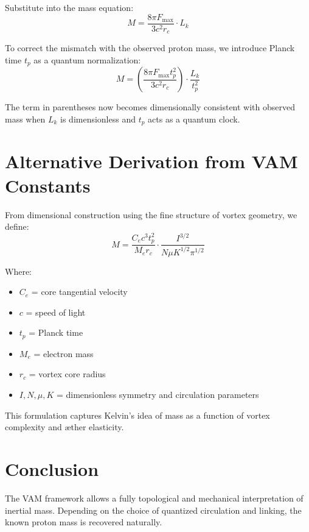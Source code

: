 \documentclass[12pt]{article}
\begin{document}
    Substitute into the mass equation:
    \begin{equation}
        M = \frac{8\pi F_{\max}}{3 c^2 r_c} \cdot L_k
    \end{equation}

    To correct the mismatch with the observed proton mass, we introduce Planck time $t_p$ as a quantum normalization:
    \begin{equation}
        M = \left( \frac{8\pi F_{\max} t_p^2}{3 c^2 r_c} \right) \cdot \frac{L_k}{t_p^2}
    \end{equation}

    The term in parentheses now becomes dimensionally consistent with observed mass when $L_k$ is dimensionless and $t_p$ acts as a quantum clock.

    \section{Alternative Derivation from VAM Constants}
    From dimensional construction using the fine structure of vortex geometry, we define:
    \begin{equation}
        \boxed{
            M = \frac{C_e c^3 t_p^2}{M_e r_c} \cdot \frac{I^{3/2}}{N \mu K^{1/2} \pi^{1/2}}
        }
    \end{equation}

    Where:
    \begin{itemize}
        \item $C_e$ = core tangential velocity
        \item $c$ = speed of light
        \item $t_p$ = Planck time
        \item $M_e$ = electron mass
        \item $r_c$ = vortex core radius
        \item $I, N, \mu, K$ = dimensionless symmetry and circulation parameters
    \end{itemize}

    This formulation captures Kelvin's idea of mass as a function of vortex complexity and æther elasticity.

    \section*{Conclusion}
    The VAM framework allows a fully topological and mechanical interpretation of inertial mass. Depending on the choice of quantized circulation and linking, the known proton mass is recovered naturally.
\end{document}
